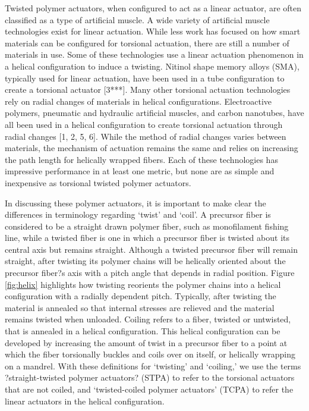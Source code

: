 \documentclass[twocolumn,10pt]{asme2e}
\begin{document}
Twisted polymer actuators, when configured to act as a linear actuator, are often classified as a type of artificial muscle. A wide variety of artificial muscle technologies exist for linear actuation. While less work has focused on how smart materials can be configured for torsional actuation, there are still a number of materials in use. Some of these technologies use a linear actuation phenomenon in a helical configuration to induce a twisting. Nitinol shape memory alloys (SMA), typically used for linear actuation, have been used in a tube configuration to create a torsional actuator [3***]. Many other torsional actuation technologies rely on  radial changes of materials in helical configurations. Electroactive polymers, pneumatic and hydraulic artificial muscles, and carbon nanotubes, have all been used in a helical configuration to create torsional actuation through radial changes [1, 2, 5, 6]. While the method of radial changes varies between materials, the mechanism of actuation remains the same and relies on increasing the path length for helically wrapped fibers. Each of these technologies has impressive performance in at least one metric, but none are as simple and inexpensive as torsional twisted polymer actuators.

In discussing these polymer actuators, it is important to make clear the differences in terminology regarding `twist' and `coil'. A precursor fiber is considered to be a straight drawn polymer fiber, such as monofilament fishing line, while a twisted fiber is one in which a precursor fiber is twisted about its central axis but remains straight. Although a twisted precursor fiber will remain straight, after twisting its polymer chains will be helically oriented about the precursor fiber?s axis with a pitch angle that depends in radial position. Figure \ref{fig:helix} highlights how twisting reorients the polymer chains into a helical configuration with a radially dependent pitch. Typically, after twisting the material is annealed so that internal stresses are relieved and the material remains twisted when unloaded. Coiling refers to a fiber, twisted or untwisted, that is annealed in a helical configuration. This helical configuration can be developed by increasing the amount of twist in a precursor fiber to a point at which the fiber torsionally buckles and coils over on itself, or helically wrapping on a mandrel. With these definitions for `twisting' and `coiling,' we use the terms ?straight-twisted polymer actuators? (STPA) to refer to the torsional actuators that are not coiled, and `twisted-coiled polymer actuators' (TCPA) to refer the linear actuators in the helical configuration. 
\end{document}
